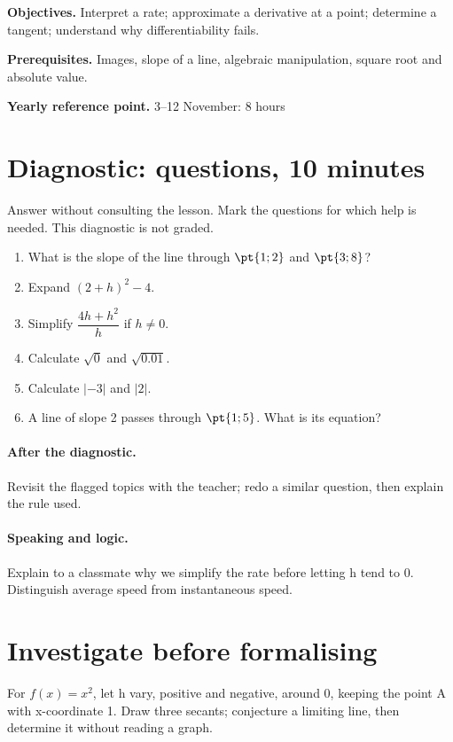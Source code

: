 \label{C04}
\begin{keypoint}
\textbf{Objectives.} Interpret a rate; approximate a derivative at a point; determine a tangent; understand why differentiability fails.

\textbf{Prerequisites.} Images, slope of a line, algebraic manipulation, square root and absolute value.

\textbf{Yearly reference point.} 3--12 November: 8 hours\end{keypoint}
\section*{Diagnostic:  questions, 10 minutes}\label{C04-D}
Answer without consulting the lesson. Mark the questions for which help is needed. This diagnostic is not graded.
\begin{enumerate}
\item What is the slope of the line through $\pt{1;2}$ and $\pt{3;8}$?
\item Expand $(2+h)^2-4$.
\item Simplify $\dfrac{4h+h^2}{h}$ if $h\ne0$.
\item Calculate $\sqrt0$ and $\sqrt{\num{0,01}}$.
\item Calculate $|-3|$ and $|2|$.
\item A line of slope 2 passes through $\pt{1;5}$. What is its equation?
\end{enumerate}
\paragraph{After the diagnostic.} Revisit the flagged topics with the teacher; redo a similar question, then explain the rule used.
\paragraph{Speaking and logic.} Explain to a classmate why we simplify the rate before letting h tend to 0. Distinguish average speed from instantaneous speed.
\mxnewpage
\section*{Investigate before formalising}\label{C04-RECH}
For $f(x)=x^2$, let h vary, positive and negative, around 0, keeping the point A with x-coordinate 1. Draw three secants; conjecture a limiting line, then determine it without reading a graph.
